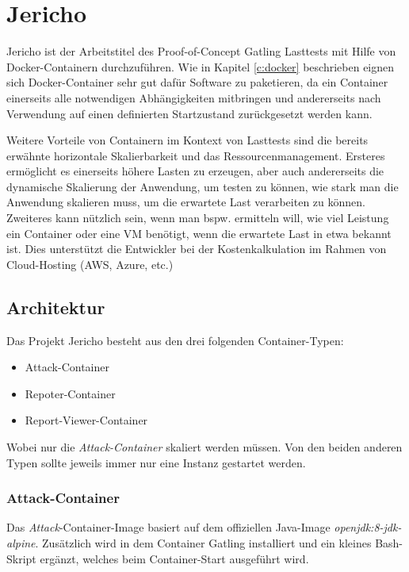 \chapter{Jericho}

Jericho ist der Arbeitstitel des Proof-of-Concept Gatling Lasttests mit Hilfe von Docker-Containern durchzuführen.
Wie in Kapitel \ref{c:docker} beschrieben eignen sich Docker-Container sehr gut dafür Software zu paketieren, da ein Container einerseits alle notwendigen Abhängigkeiten mitbringen und andererseits nach Verwendung auf einen definierten Startzustand zurückgesetzt werden kann.

Weitere Vorteile von Containern im Kontext von Lasttests sind die bereits erwähnte horizontale Skalierbarkeit und das Ressourcenmanagement.
Ersteres ermöglicht es einerseits höhere Lasten zu erzeugen, aber auch andererseits die dynamische Skalierung der Anwendung, um testen zu können, wie stark man die Anwendung skalieren muss, um die erwartete Last verarbeiten zu können.
Zweiteres kann nützlich sein, wenn man bspw. ermitteln will, wie viel Leistung ein Container oder eine \ac{VM} benötigt, wenn die erwartete Last in etwa bekannt ist.
Dies unterstützt die Entwickler bei der Kostenkalkulation im Rahmen von Cloud-Hosting (AWS, Azure, etc.)

\section{Architektur}

Das Projekt Jericho besteht aus den drei folgenden Container-Typen:

\begin{itemize}
	\item Attack-Container
	\item Repoter-Container
	\item Report-Viewer-Container
\end{itemize}

Wobei nur die \textit{Attack-Container} skaliert werden müssen.
Von den beiden anderen Typen sollte jeweils immer nur eine Instanz gestartet werden.

\subsection{Attack-Container}

Das \textit{Attack}-Container-Image basiert auf dem offiziellen Java-Image \textit{openjdk:8-jdk-alpine}.
Zusätzlich wird in dem Container Gatling installiert und ein kleines Bash-Skript ergänzt, welches beim Container-Start ausgeführt wird.

